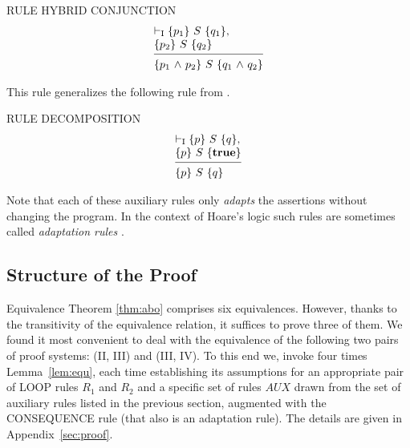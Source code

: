 \documentclass[runningheads]{llncs}       %
\newcommand{\AUX}{\mathit{AUX}}
\begin{document}
\III

\noindent
RULE HYBRID CONJUNCTION
\[
 \begin{array}{l}
  \vdash_{\rm{I}} \HT{p_1}{S}{q_1},   \\
  \HT{p_2}{S}{q_2}                    \\
  [-\medskipamount]
  \hrulefill                          \\
  \HT{p_1 \A p_2}{S}{q_1 \A q_2}
 \end{array}
\]

This rule generalizes the following rule from \cite{ABO09}.
\III

\noindent
RULE DECOMPOSITION
\[
 \begin{array}{l}
  \vdash_{\rm{I}} \HT{p}{S}{q},      \\
  \HT{p}{S}{\T}                      \\
  [-\medskipamount]
  \hrulefill                         \\
  \HT{p}{S}{q}
  \end{array}
\]

\III




Note that each of these auxiliary rules only \emph{adapts} the assertions without changing the program.
In the context of Hoare's logic such rules are sometimes called \emph{adaptation rules}
\cite{Hoa71,Old83,GR16}.



\subsection{Structure of the Proof}
\label{subsec:structure}

Equivalence Theorem \ref{thm:abo} comprises six equivalences. However,
thanks to the transitivity of the equivalence relation, it suffices to
prove three of them. We found it most convenient to deal with the
equivalence of the following two pairs of proof systems: (II, III) and
(III, IV). To this end we, invoke four times
Lemma~\ref{lem:equ}, each time establishing its assumptions for an
appropriate pair of LOOP rules $R_1$ and $R_2$ and a specific set of
rules $\AUX$ drawn from the set of auxiliary rules listed in the
previous section, augmented with the CONSEQUENCE rule (that also is an
adaptation rule).  The details are given in Appendix~\ref{sec:proof}.
\end{document}
